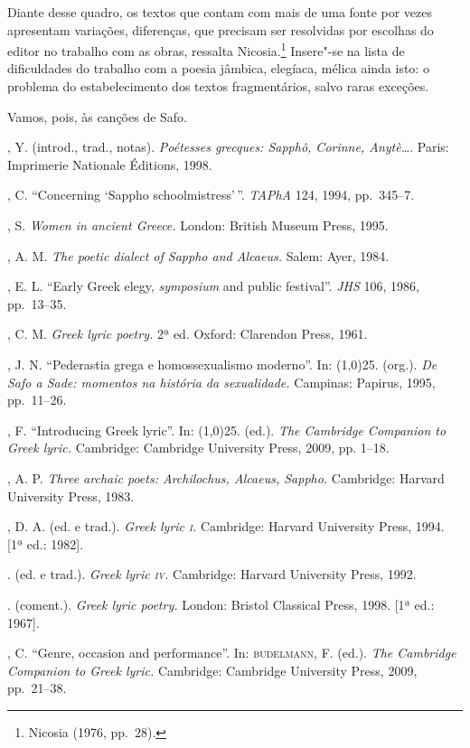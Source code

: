 Diante desse quadro, os textos que contam com mais de uma fonte por vezes
apresentam variações, diferenças, que precisam ser resolvidas por escolhas do
editor no trabalho com as obras, ressalta Nicosia.\footnote{ Nicosia (1976, pp.~28).} Insere"-se na lista
de dificuldades do trabalho com a poesia jâmbica, elegíaca, mélica
ainda isto: o problema do estabelecimento dos textos fragmentários, salvo raras
exceções. 

Vamos, pois, às canções de Safo.

\pagebreak
\begin{bibliohedra}
, Y. (introd., trad., notas). \textit{Poétesses grecques:
Sapphô, Corinne, Anytè\ldots{}}. Paris: Imprimerie Nationale Éditions, 1998.

, C. “Concerning ‘Sappho schoolmistress’\,”. \textit{TAPhA} 124,
1994, pp.~345--7.

, S. \textit{Women in ancient Greece.} London: British Museum
Press, 1995.

, A. M. \textit{The poetic dialect of Sappho and Alcaeus.} Salem:
Ayer, 1984. 

, E. L. “Early Greek elegy, \textit{symposium} and public festival”.
\textit{JHS} 106, 1986, pp.~13--35.

, C. M. \textit{Greek lyric poetry.} 2ª
ed. Oxford: Clarendon Press, 1961.

, J. N. “Pederastia grega e homossexualismo moderno”. In:
\line(1,0){25}. (org.). \textit{De Safo a Sade: momentos na história da
sexualidade.} Campinas: Papirus, 1995, pp.~11--26.

, F. “Introducing Greek lyric”. In:
\line(1,0){25}. (ed.). \textit{The Cambridge
Companion to Greek lyric.} Cambridge: Cambridge University Press, 2009, pp.
1--18.

, A. P. \textit{Three archaic poets: Archilochus, Alcaeus,
Sappho.} Cambridge: Harvard University Press, 1983. 

, D. A. (ed. e trad.). \textit{Greek lyric \textsc{i}.} Cambridge:
Harvard University Press, 1994. [1ª ed.: 1982].

\titidem. (ed. e trad.). \textit{Greek lyric \textsc{iv}.} Cambridge: Harvard
University Press, 1992.

\titidem. (coment.). \textit{Greek lyric poetry.} London: Bristol
Classical Press, 1998. [1ª ed.: 1967]. 

, C. “Genre, occasion and performance”. In:
\textsc{budelmann}, F. (ed.). \textit{The Cambridge Companion to Greek
lyric.} Cambridge: Cambridge University Press, 2009, pp.~21--38.


\end{bibliohedra}
